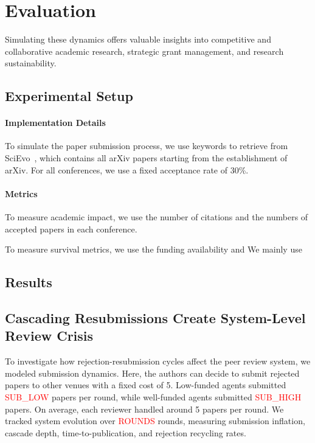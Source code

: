 \documentclass{article}
\begin{document}
\section{Evaluation}


Simulating these dynamics offers valuable insights into competitive and collaborative academic research, strategic grant management, and research sustainability.



\subsection{Experimental Setup}

\paragraph{Implementation Details}


To simulate the paper submission process, we use keywords to retrieve from SciEvo~\cite{jin2024scievo}, which contains all arXiv papers starting from the establishment of arXiv. For all conferences, we use a fixed acceptance rate of 30\%. 


\paragraph{Metrics} 
To measure academic impact, we use the number of citations and the numbers of accepted papers in each conference. 

To measure survival metrics, we use the funding availability and 
We mainly use

\subsection{Results}

\subsection{Cascading Resubmissions Create System-Level Review Crisis}

To investigate how rejection-resubmission cycles affect the peer review system, we modeled submission dynamics. 
Here, the authors can decide to submit rejected papers to other venues with a fixed cost of 5. Low-funded agents submitted \textcolor{red}{SUB\_LOW} papers per round, while well-funded agents submitted \textcolor{red}{SUB\_HIGH} papers. 
On average, each reviewer handled  around 5 papers per round. We tracked system evolution over \textcolor{red}{ROUNDS} rounds, measuring submission inflation, cascade depth, time-to-publication, and rejection recycling rates.
\end{document}
